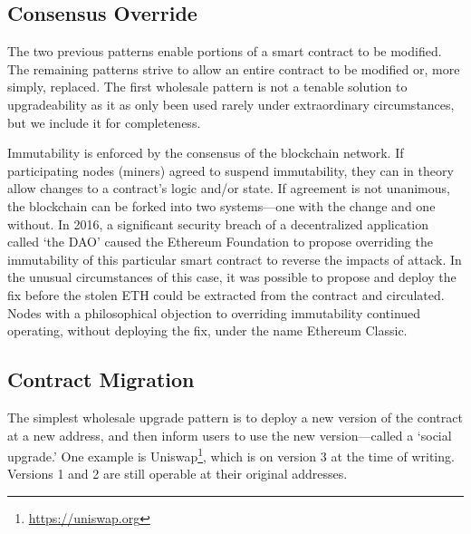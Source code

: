 
\subsection{Consensus Override}
\label{sec:hardfork}

The two previous patterns enable portions of a smart contract to be modified. The remaining patterns strive to allow an entire contract to be modified or, more simply, replaced. The first wholesale pattern is not a tenable solution to upgradeability as it as only been used rarely under extraordinary circumstances, but we include it for completeness. 

Immutability is enforced by the consensus of the blockchain network. If participating nodes (\eg miners) agreed to suspend immutability, they can in theory allow changes to a contract's logic and/or state. If agreement is not unanimous, the blockchain can be forked into two systems---one with the change and one without. In 2016, a significant security breach of a decentralized application called `the DAO' caused the Ethereum Foundation to propose overriding the immutability of this particular smart contract to reverse the impacts of attack. In the unusual circumstances of this case, it was possible to propose and deploy the fix before the stolen ETH could be extracted from the contract and circulated. Nodes with a philosophical objection to overriding immutability continued operating, without deploying the fix, under the name Ethereum Classic.



\subsection{Contract Migration}
\label{sec:migration}

The simplest wholesale upgrade pattern is to deploy a new version of the contract at a new address, and then inform users to use the new version---called a `social upgrade.' One example is Uniswap\footnote{\url{https://uniswap.org}}, which is on version 3 at the time of writing. Versions 1 and 2 are still operable at their original addresses. 

